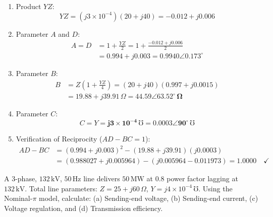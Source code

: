 \documentclass[11pt,a4paper]{article}
\newenvironment{Problem}[1][Numerical Problem]{\begin{tcolorbox}[problembox, title=#1]}{\end{tcolorbox}}
\newenvironment{Solution}[1][Step-by-Step Solution]{\begin{tcolorbox}[solbox, title=#1]}{\end{tcolorbox}}
\begin{document}
\begin{Solution}
\begin{enumerate}
  \item Product $YZ$:
    \begin{equation*}
      YZ = (j 3 \times 10^{-4})(20 + j40) = -0.012 + j 0.006
    \end{equation*}
  \item Parameter $A$ and $D$:
    \begin{align*}
      A = D &= 1 + \frac{YZ}{2} = 1 + \frac{-0.012 + j0.006}{2} \\
            &= 0.994 + j 0.003 = \mathbf{0.9940 \angle 0.173^\circ}
    \end{align*}
  \item Parameter $B$:
    \begin{align*}
      B &= Z \left(1 + \frac{YZ}{4}\right) = (20 + j40) \left(0.997 + j0.0015\right) \\
        &= 19.88 + j 39.91\,\Omega = \mathbf{44.59 \angle 63.52^\circ\,\Omega}
    \end{align*}
  \item Parameter $C$:
    \begin{equation*}
      C = Y = \mathbf{j 3 \times 10^{-4}\,\mho} = \mathbf{0.0003 \angle 90^\circ\,\mho}
    \end{equation*}
  \item Verification of Reciprocity ($AD - BC = 1$):
    \begin{align*}
      AD - BC &= (0.994 + j0.003)^2 - (19.88 + j39.91)(j 0.0003) \\
              &= (0.988027 + j 0.005964) - (j 0.005964 - 0.011973) = \mathbf{1.0000} \quad \checkmark
    \end{align*}
\end{enumerate}
\end{Solution}

\begin{Problem}[Problem 5: Performance and Voltage Regulation of Nominal-$\pi$ Line]
A 3-phase, $132\,\text{kV}$, $50\,\text{Hz}$ line delivers $50\,\text{MW}$ at $0.8$ power factor lagging at $132\,\text{kV}$. Total line parameters: $Z = 25 + j 60\,\Omega$, $Y = j 4 \times 10^{-4}\,\mho$. Using the Nominal-$\pi$ model, calculate: (a) Sending-end voltage, (b) Sending-end current, (c) Voltage regulation, and (d) Transmission efficiency.
\end{Problem}
\end{document}
